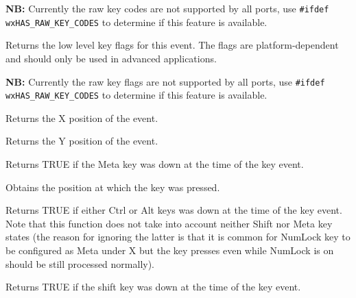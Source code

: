 {\bf NB:} Currently the raw key codes are not supported by all ports, use
{\tt\#ifdef wxHAS\_RAW\_KEY\_CODES} to determine if this feature is available.



Returns the low level key flags for this event. The flags are
platform-dependent and should only be used in advanced applications.

{\bf NB:} Currently the raw key flags are not supported by all ports, use
{\tt \#ifdef wxHAS\_RAW\_KEY\_CODES} to determine if this feature is available.



Returns the X position of the event.



Returns the Y position of the event.



Returns TRUE if the Meta key was down at the time of the key event.




Obtains the position at which the key was pressed.



Returns TRUE if either {\sc Ctrl} or {\sc Alt} keys was down
at the time of the key event. Note that this function does not take into
account neither {\sc Shift} nor {\sc Meta} key states (the reason for ignoring
the latter is that it is common for {\sc NumLock} key to be configured as
{\sc Meta} under X but the key presses even while {\sc NumLock} is on should
be still processed normally).

\label{wxkeyeventshiftdown}


Returns TRUE if the shift key was down at the time of the key event.

